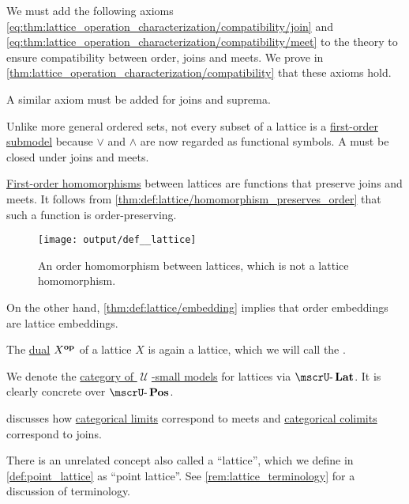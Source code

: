 \begin{definition}
\begin{thmenum}[resume=def:lattice]
    We must add the following axioms \eqref{eq:thm:lattice_operation_characterization/compatibility/join} and \eqref{eq:thm:lattice_operation_characterization/compatibility/meet} to the theory to ensure compatibility between order, joins and meets. We prove in \cref{thm:lattice_operation_characterization/compatibility} that these axioms hold.

    A similar axiom must be added for joins and suprema.

     Unlike more general ordered sets, not every subset of a lattice is a \hyperref[def:first_order_submodel]{first-order submodel} because \( \vee \) and \( \wedge \) are now regarded as functional symbols. A  must be closed under joins and meets.

     \hyperref[def:first_order_homomorphism]{First-order homomorphisms} between lattices are functions that preserve joins and meets. It follows from \cref{thm:def:lattice/homomorphism_preserves_order} that such a function is order-preserving.

    \begin{figure}[!ht]
      \centering
      \texttt{[image: output/def\_\_lattice]}
      \caption{An order homomorphism between lattices, which is not a lattice homomorphism.}
      \label{fig:def:lattice/homomorphism/order_homomorphism_not_lattice_homomorrphism}
    \end{figure}

    On the other hand, \cref{thm:def:lattice/embedding} implies that order embeddings are lattice embeddings.

     The \hyperref[def:preordered_set/opposite]{dual} \( X^\oppos \) of a lattice \( X \) is again a lattice, which we will call the .

     We denote the \hyperref[def:category_of_small_first_order_models]{category of \( \mscrU \)-small models} for lattices via \( \ucat{Lat} \). It is clearly concrete over \hyperref[def:partially_ordered_set]{\( \ucat{Pos} \)}.

     discusses how \hyperref[def:category_of_cones/limit]{categorical limits} correspond to meets and \hyperref[def:category_of_cones/colimit]{categorical colimits} correspond to joins.
  \end{thmenum}
\end{definition}
\begin{comments}
  \item There is an unrelated concept also called a \enquote{lattice}, which we define in \cref{def:point_lattice} as \enquote{point lattice}. See \cref{rem:lattice_terminology} for a discussion of terminology.
\end{comments}

